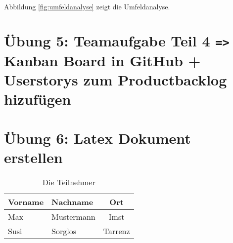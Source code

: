 \documentclass[a4paper,12pt]{report}
\begin{document}
    Abbildung \ref{fig:umfeldanalyse} zeigt die Umfeldanalyse.
    



    \chapter{Übung 5: Teamaufgabe Teil 4 \texttt{=>} Kanban Board in GitHub + Userstorys zum Productbacklog hizufügen}
    \chapter{Übung 6: Latex Dokument erstellen}
    

    
    \begin{table}[h]
        \begin{center}
            \begin{tabular}{ l  l | c }
             Vorname & Nachname & Ort \\
             \hline
             Max & Mustermann & Imst \\  
             Susi & Sorglos & Tarrenz    
            \end{tabular}
        \end{center}
        \caption{Die Teilnehmer}
        \label{tab:teilnehmer}
    \end{table}
 
\end{document}
